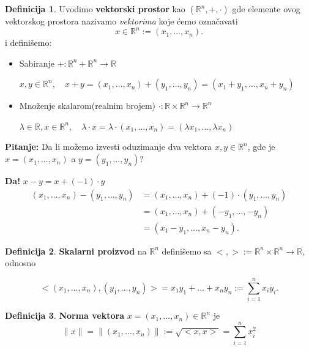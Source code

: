 \documentclass[11pt]{article}
\theoremstyle{definition}
\newtheorem{definicija}{Definicija}[section]
\theoremstyle{serbnodot}
\newcommand{\pitanje}[1]{%
    \begin{pitbox}
    \textbf{Pitanje:} #1
    \end{pitbox}
}
\begin{document}
\begin{definicija}
    Uvodimo \textbf{vektorski prostor} kao \( (\mathbb{R}^n, +, \cdot) \) gde
    elemente ovog vektorskog prostora nazivamo \textit{vektorima} koje ćemo označavati 
    \[
        x \in \mathbb{R}^n := (x_1, \dots, x_n).
    \]
    i definišemo:
    \begin{itemize}
        \item Sabiranje \( + : \mathbb{R}^n + \mathbb{R}^n \rightarrow \mathbb{R} \)

            \( x, y \in \mathbb{R}^n, \quad x + y = (x_1, \dots, x_n) + (y_1, \dots, y_n) 
            = (x_1 + y_1, \dots, x_n + y_n) \)
        \item Množenje skalarom(realnim brojem) \( \cdot : \mathbb{R} \times \mathbb{R}^n 
        \rightarrow \mathbb{R}^n \)

            \( \lambda \in \mathbb{R}, x \in \mathbb{R}^n, \quad \lambda \cdot x = 
            \lambda \cdot (x_1, \dots, x_n) = (\lambda x_1, \dots, \lambda x_n) \)
    \end{itemize}
\end{definicija}

\pitanje{
    Da li možemo izvesti oduzimanje dva vektora \( x, y \in \mathbb{R}^n \), gde je 
    \( x = (x_1, \dots, x_n) \)
    a \( y= (y_1, \dots, y_n) \)?

    \medskip
    \textbf{Da! } \( x - y = x + (-1) \cdot y\)
    \begin{align*}
        (x_1, \dots, x_n) - (y_1, \dots, y_n) &= (x_1, \dots, x_n) 
        + (-1) \cdot (y_1, \dots, y_n) \\
        &= (x_1, \dots, x_n) + (-y_1, \dots, -y_n) \\
        &= (x_1 - y_1, \dots, x_n - y_n).
    \end{align*}
}


\begin{definicija}
    \textbf{Skalarni proizvod} na \( \mathbb{R}^n \) definišemo sa \( <,> := \mathbb{R}^n
    \times \mathbb{R}^n \rightarrow \mathbb{R}\), odnosno

    \[
        <(x_1, \dots, x_n), (y_1, \dots, y_n)> = x_1y_1 + \dots + x_ny_n
         := \sum_{i = 1}^{n}{x_iy_i}.
    \]
\end{definicija}

\begin{definicija}
    \textbf{Norma vektora} \( x = (x_1, \dots, x_n) \in \mathbb{R}^n \) je 
    \[
        \lVert x \rVert = \lVert (x_1, \dots, x_n) \rVert := \sqrt{<x,x>} 
        = \sum_{i=1}^{n}{x_i^2}
    \]
\end{definicija}
\end{document}
